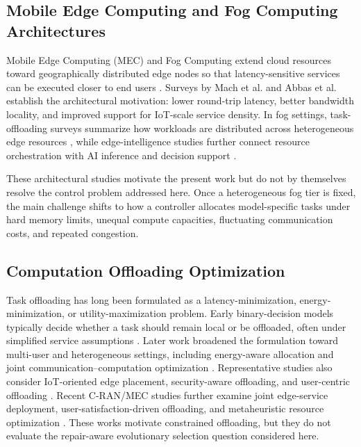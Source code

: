 \documentclass[pdflatex,sn-mathphys-num]{sn-jnl}
\begin{document}
\subsection{Mobile Edge Computing and Fog Computing Architectures}
Mobile Edge Computing (MEC) and Fog Computing extend cloud resources toward geographically distributed edge nodes so that latency-sensitive services can be executed closer to end users \cite{Mao2017, Shi2016}. Surveys by Mach et al. \cite{Mach2017} and Abbas et al. \cite{Abbas2018} establish the architectural motivation: lower round-trip latency, better bandwidth locality, and improved support for IoT-scale service density. In fog settings, task-offloading surveys summarize how workloads are distributed across heterogeneous edge resources \cite{Kumari2022}, while edge-intelligence studies further connect resource orchestration with AI inference and decision support \cite{Zhou2019}.

These architectural studies motivate the present work but do not by themselves resolve the control problem addressed here. Once a heterogeneous fog tier is fixed, the main challenge shifts to how a controller allocates model-specific tasks under hard memory limits, unequal compute capacities, fluctuating communication costs, and repeated congestion.

\subsection{Computation Offloading Optimization}
Task offloading has long been formulated as a latency-minimization, energy-minimization, or utility-maximization problem. Early binary-decision models typically decide whether a task should remain local or be offloaded, often under simplified service assumptions \cite{Zhang2016}. Later work broadened the formulation toward multi-user and heterogeneous settings, including energy-aware allocation and joint communication--computation optimization \cite{Chen2018, You2017, Liu2016, Bi2018, Zhou2019, Deng2020}. Representative studies also consider IoT-oriented edge placement, security-aware offloading, and user-centric offloading \cite{Sun2016, Premsankar2018, Samy2022, Deng2021}. Recent C-RAN/MEC studies further examine joint edge-service deployment, user-satisfaction-driven offloading, and metaheuristic resource optimization \cite{pan2024joint,yang2024satisfaction,wang2025firefly}. These works motivate constrained offloading, but they do not evaluate the repair-aware evolutionary selection question considered here.
\end{document}
